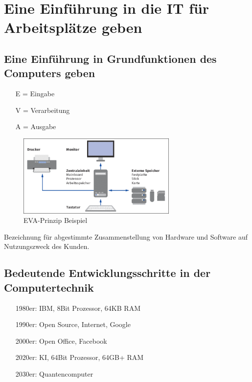 \section{Eine Einführung in die IT für Arbeitsplätze geben}
\subsection{Eine Einführung in Grundfunktionen des Computers geben}
    \vspace{0.5em}
    \begin{tcolorbox}[width=9cm, center, title=EVA-Grundprinzip der Datenverarbeitung, coltitle=white, colframe=orange, colback=white!60!orange]
        \begin{itemize}
            \item[E =] Eingabe
            \item[V =] Verarbeitung
            \item[A =] Ausgabe
        \end{itemize}
    \end{tcolorbox}
    \vspace{-0.5em}
    \begin{figure}[h]
        \centering
        \includegraphics[width=0.7\textwidth]{./images/2.1.1_konfiguration.png}
        \caption{EVA-Prinzip Beispiel}\label{fig:EVA-Prinzip}
    \end{figure}
    \vspace{-0.5em}
    \begin{tcolorbox}[width=13cm, center, title=Konfiguration, coltitle=white, colframe=white!20!blue, colback=white!80!blue]
        Bezeichnung für abgestimmte Zusammenstellung von Hardware und Software auf Nutzungszweck des Kunden.
    \end{tcolorbox}
    \vspace{0.25em}
\subsection{Bedeutende Entwicklungsschritte in der Computertechnik}
    \vspace{0.5em}
    \begin{itemize}[leftmargin=3cm]
        \item[1980er:] IBM, 8Bit Prozessor, 64KB RAM
        \item[1990er:] Open Source, Internet, Google
        \item[2000er:] Open Office, Facebook
        \item[2020er:] KI, 64Bit Prozessor, 64GB+ RAM
        \item[2030er:] Quantencomputer
    \end{itemize}

